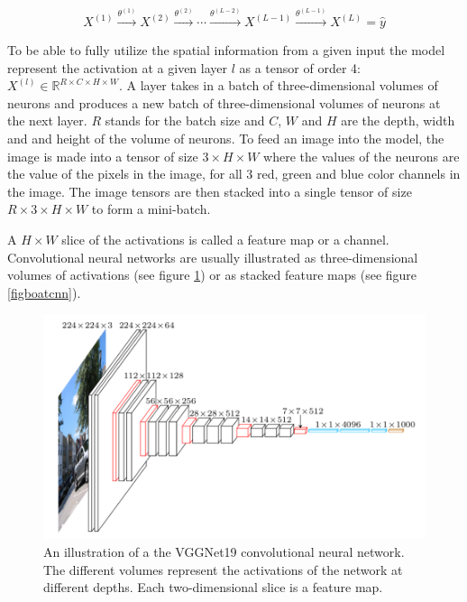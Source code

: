 \documentclass[a4paper, twoside]{article}
\begin{document}
\begin{equation}\label{CNNeq}
X^{(1)} \xrightarrow{\theta^{(1)}} X^{(2)}  \xrightarrow{\theta^{(2)}} \cdots  \xrightarrow{\theta^{(L-2)}} X^{(L-1)}  \xrightarrow{\theta^{(L-1)}} X^{(L)} = \hat{y}
\end{equation}

To be able to fully utilize the spatial information from a given input the model represent the activation at a given layer $l$ as a tensor of order 4: $X^{(l)} \in \mathbb{R}^{R \times C  \times H \times W}$. A layer takes in a batch of three-dimensional volumes of neurons and produces a new batch of three-dimensional volumes of neurons at the next layer. $R$ stands for the batch size and $C$, $W$ and $H$ are the depth, width and and height of the volume of neurons. To feed an image into the model, the image is made into a tensor of size $3 \times H \times W$ where the values of the neurons are the value of the pixels in the image, for all 3 red, green and blue color channels in the image. The image tensors are then stacked into a single tensor of size $R \times 3 \times H \times W$ to form a mini-batch. \cite{cs231n} 

A $H \times W$ slice of the activations is called a feature map or a channel. Convolutional neural networks are usually illustrated as three-dimensional volumes of activations (see figure \ref{figvgg}) or as stacked feature maps (see figure \ref{figboatcnn}). \cite{cs231n} \cite{convmath} \cite{convarithmetic}

\begin{figure}[h]
	\centering
  		\includegraphics[scale=0.6]{vggnet.png}
  	\caption{An illustration of a the VGGNet19 convolutional neural network. The different volumes represent the activations of the network at different depths. Each two-dimensional slice is a feature map. \cite{vgg}} \label{figvgg}
\end{figure}
\end{document}
